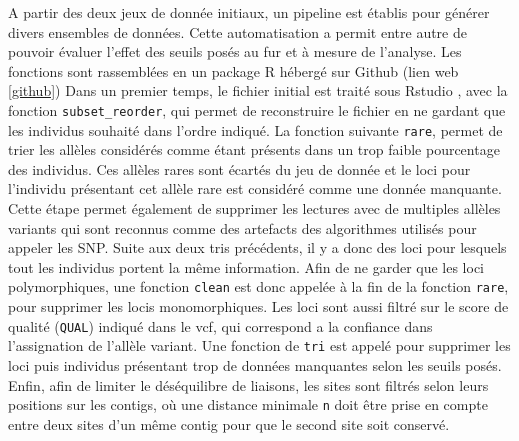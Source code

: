 A partir des deux jeux de donnée initiaux, un pipeline est établis pour générer divers ensembles de données. 
Cette automatisation a permit entre autre de pouvoir évaluer l'effet des seuils posés au fur et à mesure de l'analyse. 
Les fonctions sont rassemblées en un package R hébergé sur Github (lien web \ref{github})
Dans un premier temps, le fichier initial est traité sous Rstudio \citep{RTeam2017}, avec la fonction \verb|subset_reorder|, qui permet de reconstruire le fichier en ne gardant que les individus souhaité dans l'ordre indiqué. La fonction suivante \verb|rare|, permet de trier les allèles considérés comme étant présents dans un trop faible pourcentage des individus. 
Ces allèles rares sont écartés du jeu de donnée et le loci pour l'individu présentant cet allèle rare est considéré comme une donnée manquante. 
Cette étape permet également de supprimer les lectures avec de multiples allèles variants qui sont reconnus comme des artefacts des algorithmes utilisés pour appeler les SNP.  
Suite aux deux tris précédents, il y a donc des loci pour lesquels tout les individus portent la même information. 
Afin de ne garder que les loci polymorphiques, une fonction \verb|clean| est donc appelée à la fin de la fonction \verb|rare|, pour supprimer les locis monomorphiques.
Les loci sont aussi filtré sur le score de qualité (\verb|QUAL|) indiqué dans le vcf, qui correspond a la confiance dans l'assignation de l'allèle variant. 
Une fonction de \verb|tri| est appelé pour supprimer les loci puis individus présentant trop de données manquantes selon les seuils posés.
Enfin, afin de limiter le déséquilibre de liaisons, les sites sont filtrés selon leurs positions sur les contigs, où une distance minimale \verb|n| doit être prise en compte entre deux sites d'un même contig pour que le second site soit conservé.


